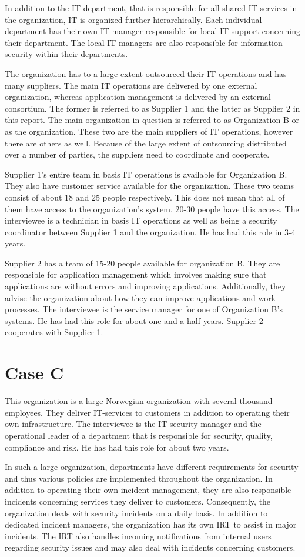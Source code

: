 In addition to the IT department, that is responsible for all shared IT services in the organization, IT is organized further hierarchically. Each individual department has their own IT manager responsible for local IT support concerning their department. The local IT managers are also responsible for information security within their departments.

The organization has to a large extent outsourced their IT operations and has many suppliers. The main IT operations are delivered by one external organization, whereas application management is delivered by an external consortium. The former is referred to as Supplier 1 and the latter as Supplier 2 in this report. The main organization in question is referred to as Organization B or as the organization. These two are the main suppliers of IT operations, however there are others as well. Because of the large extent of outsourcing distributed over a number of parties, the suppliers need to coordinate and cooperate.

Supplier 1's entire team in basis IT operations is available for Organization B. They also have customer service available for the organization. These two teams consist of about 18 and 25 people respectively. This does not mean that all of them have access to the organization's system. 20-30 people have this access. The interviewee is a technician in basis IT operations as well as being a security coordinator between Supplier 1 and the organization. He has had this role in 3-4 years.

Supplier 2 has a team of 15-20 people available for organization B. They are responsible for application management which involves making sure that applications are without errors and improving applications. Additionally, they advise the organization about how they can improve applications and work processes. The interviewee is the service manager for one of Organization B's systems. He has had this role for about one and a half years. Supplier 2 cooperates with Supplier 1.

\section{Case C}
This organization is a large Norwegian organization with several thousand employees. They deliver IT-services to customers in addition to operating their own infrastructure. The interviewee is the IT security manager  and the operational leader of a department that is responsible for security, quality, compliance and risk. He has had this role for about two years.

In such a large organization, departments have different requirements for security and thus various policies are implemented throughout the organization. In addition to operating their own incident management, they are also responsible incidents concerning services they deliver to customers. Consequently, the organization deals with security incidents on a daily basis. In addition to dedicated incident managers, the organization has its own \ac{IRT} to assist in major incidents. The \ac{IRT} also handles incoming notifications from internal users regarding security issues and may also deal with incidents concerning customers. 